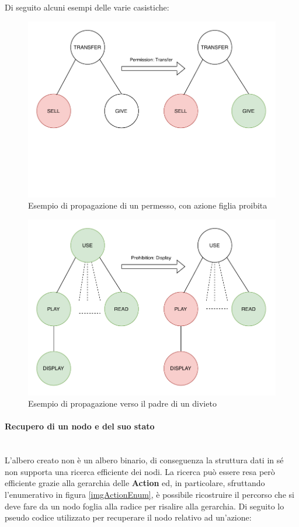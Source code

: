 \documentclass[12pt,a4paper,twoside]{book}
\begin{document}
Di seguito alcuni esempi delle varie casistiche:
\begin{figure}[H]
\centering
\includegraphics[scale=.50]{../immagini/propagationPerm}
\caption{Esempio di propagazione di un permesso, con azione figlia proibita}
\label{examplePerm}
\end{figure}
\begin{figure}[htp]
\centering
\includegraphics[scale=.50]{../immagini/propagationProParent}
\caption{Esempio di propagazione verso il padre di un divieto}
\label{exampleProParent}
\end{figure}

\paragraph{Recupero di un nodo e del suo stato}\mbox{}\\
L'albero creato non è un albero binario, di conseguenza la struttura dati in sé non supporta una ricerca efficiente dei nodi. La ricerca può essere resa però efficiente grazie alla gerarchia delle \textbf{Action} ed, in particolare, sfruttando l'enumerativo in figura \ref{imgActionEnum}, è possibile ricostruire il percorso che si deve fare da un nodo foglia alla radice per risalire alla gerarchia. Di seguito lo pseudo codice utilizzato per recuperare il nodo relativo ad un'azione:
\end{document}
